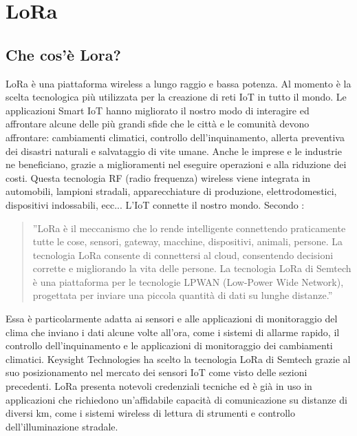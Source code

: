 \documentclass[a4paper]{report} %
\begin{document}
\section{LoRa}
\subsection{Che cos'è Lora?}
LoRa è una piattaforma wireless a lungo raggio e bassa potenza. Al momento è la scelta tecnologica più utilizzata per la creazione di reti IoT in tutto il mondo. Le applicazioni Smart IoT hanno migliorato il nostro modo di interagire ed affrontare alcune delle più grandi sfide che le città e le comunità devono affrontare: cambiamenti climatici, controllo dell'inquinamento, allerta preventiva dei disastri naturali e salvataggio di vite umane. Anche le imprese e le industrie ne beneficiano, grazie a miglioramenti nel eseguire operazioni e alla riduzione dei costi. Questa tecnologia RF (radio frequenza) wireless viene integrata in automobili, lampioni stradali, apparecchiature di produzione, elettrodomestici, dispositivi indossabili, ecc... L'IoT connette il nostro mondo. Secondo \cite{art:rif.24}:
\begin{quote}
	''LoRa è il meccanismo che lo rende intelligente connettendo praticamente tutte le cose, sensori, gateway, macchine, dispositivi, animali, persone. La tecnologia LoRa consente di connettersi al cloud, consentendo decisioni corrette e migliorando la vita delle persone. La tecnologia LoRa di Semtech è una piattaforma per le tecnologie LPWAN (Low-Power Wide Network), progettata per inviare una piccola quantità di dati su lunghe distanze.''
\end{quote} 
Essa è particolarmente adatta ai sensori e alle applicazioni di monitoraggio del clima che inviano i dati alcune volte all'ora, come i sistemi di allarme rapido, il controllo dell'inquinamento e le applicazioni di monitoraggio dei cambiamenti climatici. Keysight Technologies ha scelto la tecnologia LoRa di Semtech grazie al suo posizionamento nel mercato dei sensori IoT come visto delle sezioni precedenti. LoRa presenta notevoli credenziali tecniche ed è già in uso in applicazioni che richiedono un'affidabile capacità di comunicazione su distanze di diversi km, come i sistemi wireless di lettura di strumenti e controllo dell'illuminazione stradale.
\end{document}
